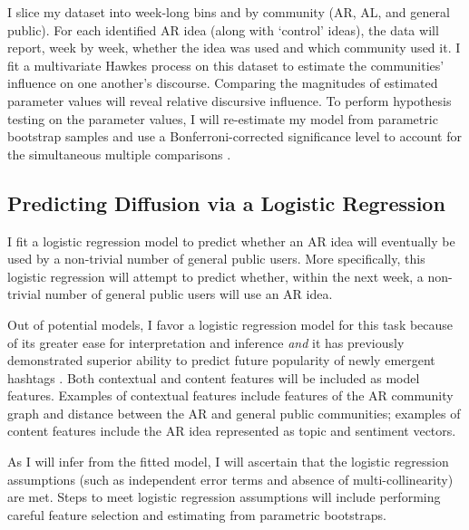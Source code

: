 \documentclass[acmlarge, screen, authorversion]{acmart}
\begin{document}
I slice my dataset into week-long bins and by community (AR, AL, and general public). For each identified AR idea (along with  `control' ideas), the data will report, week by week, whether the idea was used and which community used it. I fit a multivariate Hawkes process on this dataset to estimate the communities' influence on one another's discourse. Comparing the magnitudes of estimated parameter values will reveal relative discursive influence. To perform hypothesis testing on the parameter values, I will re-estimate my model from parametric bootstrap samples \cite{reinhartReviewSelfExcitingSpatioTemporal2018} and use a Bonferroni-corrected significance level to account for the simultaneous multiple comparisons \cite{tanEffectWordingMessage2014}.




\subsection{Predicting Diffusion via a Logistic Regression}

I fit a logistic regression model to predict whether an AR idea will eventually be used by a non-trivial number of general public users. More specifically, this logistic regression will attempt to predict whether, within the next week, a non-trivial number of general public users will use an AR idea. 

Out of potential models, I favor a logistic regression model for this task because of its greater ease for interpretation and inference \textit{and} it has previously demonstrated superior ability to predict future popularity of newly emergent hashtags \cite{maPredictingPopularityNewly2013}. Both contextual and content features will be included as model features. Examples of contextual features include features of the AR community graph and distance between the AR and general public communities; examples of content features include the AR idea represented as topic and sentiment vectors. 

As I will infer from the fitted model, I will ascertain that the logistic regression assumptions (such as independent error terms and absence of multi-collinearity) are met. Steps to meet logistic regression assumptions will include performing careful feature selection and estimating from parametric bootstraps.
\end{document}
